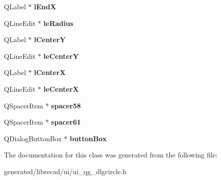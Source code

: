 \begin{DoxyCompactItemize}
\item 
\hypertarget{classUi__QG__DlgCircle_ad1e557dc84a0f96d208ae0b5c3959be9}{Q\-Label $\ast$ {\bfseries l\-End\-X}}\label{classUi__QG__DlgCircle_ad1e557dc84a0f96d208ae0b5c3959be9}

\item 
\hypertarget{classUi__QG__DlgCircle_a88e7ebbbfbeeafa10fe092ec5a0e2396}{Q\-Line\-Edit $\ast$ {\bfseries le\-Radius}}\label{classUi__QG__DlgCircle_a88e7ebbbfbeeafa10fe092ec5a0e2396}

\item 
\hypertarget{classUi__QG__DlgCircle_ae6f2d79fcee3cac5303e3c49ca113182}{Q\-Label $\ast$ {\bfseries l\-Center\-Y}}\label{classUi__QG__DlgCircle_ae6f2d79fcee3cac5303e3c49ca113182}

\item 
\hypertarget{classUi__QG__DlgCircle_af386bda859a5f62629e67272183d2ed3}{Q\-Line\-Edit $\ast$ {\bfseries le\-Center\-Y}}\label{classUi__QG__DlgCircle_af386bda859a5f62629e67272183d2ed3}

\item 
\hypertarget{classUi__QG__DlgCircle_a256245f469bab43fe751c0820d2b6b81}{Q\-Label $\ast$ {\bfseries l\-Center\-X}}\label{classUi__QG__DlgCircle_a256245f469bab43fe751c0820d2b6b81}

\item 
\hypertarget{classUi__QG__DlgCircle_ab5bc4ebaf7e8e3deef8f118db4994d1d}{Q\-Line\-Edit $\ast$ {\bfseries le\-Center\-X}}\label{classUi__QG__DlgCircle_ab5bc4ebaf7e8e3deef8f118db4994d1d}

\item 
\hypertarget{classUi__QG__DlgCircle_af9e515ace3eeff7421313d92ebd1007d}{Q\-Spacer\-Item $\ast$ {\bfseries spacer58}}\label{classUi__QG__DlgCircle_af9e515ace3eeff7421313d92ebd1007d}

\item 
\hypertarget{classUi__QG__DlgCircle_a8fbda0cacfd80aa93732e746a7926070}{Q\-Spacer\-Item $\ast$ {\bfseries spacer61}}\label{classUi__QG__DlgCircle_a8fbda0cacfd80aa93732e746a7926070}

\item 
\hypertarget{classUi__QG__DlgCircle_a8b595414fafd742fef5cd7293021db5f}{Q\-Dialog\-Button\-Box $\ast$ {\bfseries button\-Box}}\label{classUi__QG__DlgCircle_a8b595414fafd742fef5cd7293021db5f}

\end{DoxyCompactItemize}


The documentation for this class was generated from the following file\-:\begin{DoxyCompactItemize}
\item 
generated/librecad/ui/ui\-\_\-qg\-\_\-dlgcircle.\-h\end{DoxyCompactItemize}
